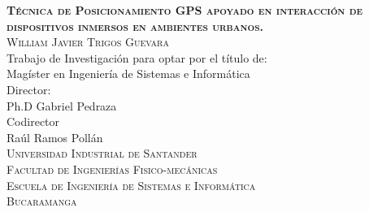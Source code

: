 	\begin{titlepage}
		\begin{center}
			
			\textsc{\Large \textbf{Técnica de Posicionamiento GPS apoyado en interacción de dispositivos inmersos en ambientes urbanos.}}\\[4cm]
			
			\textsc{William Javier Trigos Guevara}\\[2.8cm]
			Trabajo de Investigación para optar por el t\'itulo de:\\[0.4cm]
			{\Large Mag\'ister en Ingenier\'ia de Sistemas e Inform\'atica}\\[3.5cm]
			Director:\\
			Ph.D Gabriel Pedraza\\[0.5cm]
			Codirector\\ 
			Raúl Ramos Pollán\\[3.0cm]
			\textsc{Universidad Industrial de Santander}\\
			\textsc{Facultad de Ingenier\'ias Fisico-mec\'anicas}\\
			\textsc{Escuela de Ingenier\'ia de Sistemas e Inform\'atica}\\
			\textsc{Bucaramanga}\\
			\the\year
		\end{center}
	\end{titlepage}